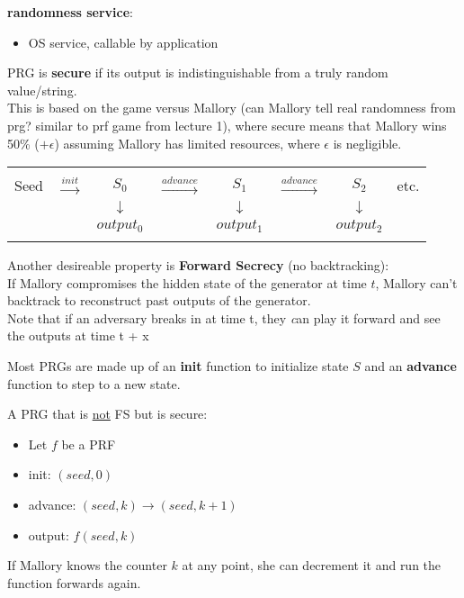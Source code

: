 {\bf randomness service}:
\begin{itemize}
    \item OS service, callable by application
    
\end{itemize}

\begin{definition}
PRG is {\bf secure} if its output is indistinguishable from a truly random
value/string.\\ This is based on the game versus Mallory (can Mallory
tell real randomness from prg? similar to prf game from lecture 1),
where secure means that Mallory wins 50\% ($+\epsilon$) assuming
Mallory has limited resources, where $\epsilon$ is negligible.
\end{definition}

\begin{tabular}{cccccccc}
&&&&&&& \\
Seed & $\xrightarrow{init}$ & $ S_0 $ & $\xrightarrow{advance}$ & $ S_1$ & $\xrightarrow{advance}$ & $S_2$ & etc.\\
& & $\downarrow$ & & $\downarrow$ & &  $\downarrow$ &\\
& & $output_0$ & & $output_1$ & &  $output_2$ &\\
&&&&&&&
\end{tabular}

Another desireable property is {\bf Forward Secrecy} (no backtracking):\\
If Mallory compromises the hidden state of the generator at time $t$, Mallory
can't backtrack to reconstruct past outputs of the generator.\\

Note that if an adversary breaks in at time t, they {\textit can} play it forward and see the outputs at time t + x

Most PRGs are made up of an \textbf{init} function to initialize state
$S$ and an \textbf{advance} function to step to a new state.

\begin{example}{A PRG that is \underline{not} FS but is secure:}
    \begin{itemize}
    \item Let $f$ be a PRF
    \item init: $(seed, 0)$
    \item advance: $(seed, k) \rightarrow (seed, k + 1)$
    \item output: $f(seed, k)$
    \end{itemize}
    If Mallory knows the counter $k$ at any point, she can decrement it and run the function forwards again. 
\end{example}

